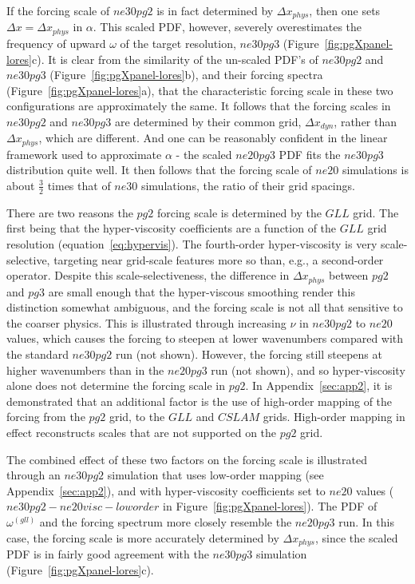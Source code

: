 \documentclass{agujournal}
\begin{document}
If the forcing scale of $ne30pg2$ is in fact determined by $\Delta x_{phys}$, then one sets $\Delta x = \Delta x_{phys}$ in $\alpha$. This scaled PDF, however, severely overestimates the frequency of upward $\omega$ of the target resolution, $ne30pg3$ (Figure~\ref{fig:pgXpanel-lores}c). It is clear from the similarity of the un-scaled PDF's of $ne30pg2$ and $ne30pg3$ (Figure~\ref{fig:pgXpanel-lores}b), and their forcing spectra (Figure~\ref{fig:pgXpanel-lores}a), that the characteristic forcing scale in these two configurations are approximately the same. It follows that the forcing scales in $ne30pg2$ and $ne30pg3$ are determined by their common grid, $\Delta x_{dyn}$, rather than $\Delta x_{phys}$, which are different. And one can be reasonably confident in the linear framework used to approximate $\alpha$ - the scaled $ne20pg3$ PDF fits the $ne30pg3$ distribution quite well. It then follows that the forcing scale of $ne20$ simulations is about $\frac{3}{2}$ times that of $ne30$ simulations, the ratio of their grid spacings.

There are two reasons the $pg2$ forcing scale is determined by the $GLL$ grid. The first being that the hyper-viscosity coefficients are a function of the $GLL$ grid resolution (equation~\eqref{eq:hypervis}). The fourth-order hyper-viscosity is very scale-selective, targeting near grid-scale features more so than, e.g., a second-order operator. Despite this scale-selectiveness, the difference in $\Delta x_{phys}$ between $pg2$ and $pg3$ are small enough that the hyper-viscous smoothing render this distinction somewhat ambiguous, and the forcing scale is not all that sensitive to the coarser physics. This is illustrated through increasing $\nu$ in $ne30pg2$ to $ne20$ values, which causes the forcing to steepen at lower wavenumbers compared with the standard $ne30pg2$ run (not shown). However, the forcing still steepens at higher wavenumbers than in the $ne20pg3$ run (not shown), and so hyper-viscosity alone does not determine the forcing scale in $pg2$. In Appendix~\ref{sec:app2}, it is demonstrated that an additional factor is the use of high-order mapping of the forcing from the $pg2$ grid, to the $GLL$ and $CSLAM$ grids. High-order mapping in effect reconstructs scales that are not supported on the $pg2$ grid.

The combined effect of these two factors on the forcing scale is illustrated through an $ne30pg2$ simulation that uses low-order mapping (see Appendix~\ref{sec:app2}), and with hyper-viscosity coefficients set to $ne20$ values ($ne30pg2-ne20visc-loworder$ in Figure~\ref{fig:pgXpanel-lores}). The PDF of $\omega^{(gll)}$ and the forcing spectrum more closely resemble the $ne20pg3$ run. In this case, the forcing scale is more accurately determined by $\Delta x_{phys}$, since the scaled PDF is in fairly good agreement with the $ne30pg3$ simulation (Figure~\ref{fig:pgXpanel-lores}c).
\end{document}
